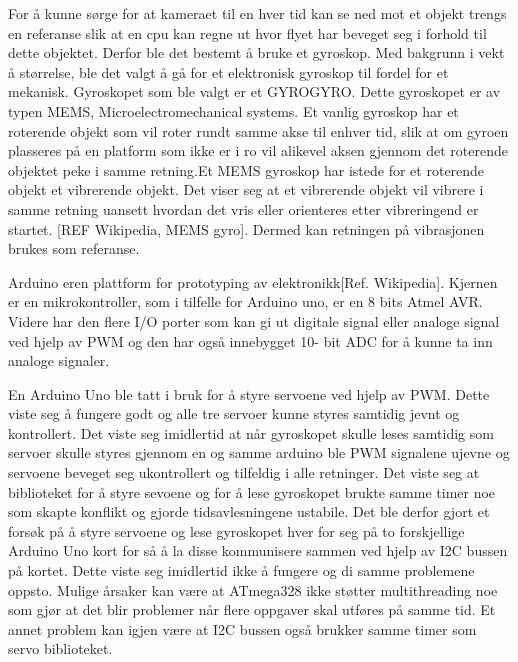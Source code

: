 
For å kunne sørge for at kameraet til en hver tid kan se ned mot et objekt trengs en referanse slik at en cpu kan regne ut hvor flyet har beveget seg i forhold til dette objektet. Derfor ble det bestemt å bruke et gyroskop. Med bakgrunn i vekt å størrelse, ble det valgt å gå for et elektronisk gyroskop til fordel for et mekanisk. Gyroskopet som ble valgt er et GYROGYRO. Dette gyroskopet er av typen MEMS, Microelectromechanical systems. Et vanlig gyroskop har et roterende objekt som vil roter rundt samme akse til enhver tid, slik at om gyroen plasseres på en platform som ikke er i ro vil alikevel aksen gjennom det roterende objektet peke i samme retning.Et MEMS gyroskop har istede for et roterende objekt et vibrerende objekt. Det viser seg at et vibrerende objekt vil vibrere i samme retning uansett hvordan det vris eller orienteres etter vibreringend er startet. [REF Wikipedia, MEMS gyro]. Dermed kan retningen på vibrasjonen brukes som referanse.  

Arduino eren plattform for prototyping av elektronikk[Ref. Wikipedia]. Kjernen er en mikrokontroller, som i tilfelle for Arduino uno, er en 8 bits Atmel AVR. Videre har den flere I/O porter som kan gi ut digitale signal eller analoge signal ved hjelp av PWM og den har også innebygget 10- bit ADC for å kunne ta inn analoge signaler. 

En Arduino Uno ble tatt i bruk for å styre servoene ved hjelp av PWM. Dette viste seg å fungere godt og alle tre servoer kunne styres samtidig jevnt og kontrollert. Det viste seg imidlertid at når gyroskopet skulle leses samtidig som servoer skulle styres gjennom en og samme arduino ble PWM signalene ujevne og servoene beveget seg ukontrollert og tilfeldig i alle retninger. Det viste seg at biblioteket for å styre sevoene og for å lese gyroskopet brukte samme timer noe som skapte konflikt og gjorde tidsavlesningene ustabile. Det ble derfor gjort et forsøk på å styre servoene og lese gyroskopet hver for seg på to forskjellige Arduino Uno kort for så å la disse kommunisere sammen ved hjelp av I2C bussen på kortet. Dette viste seg imidlertid ikke å fungere og di samme problemene oppsto. Mulige årsaker kan være at ATmega328 ikke støtter multithreading noe som gjør at det blir problemer når flere oppgaver skal utføres på samme tid. Et annet problem kan igjen være at I2C bussen også brukker samme timer som servo biblioteket.  

